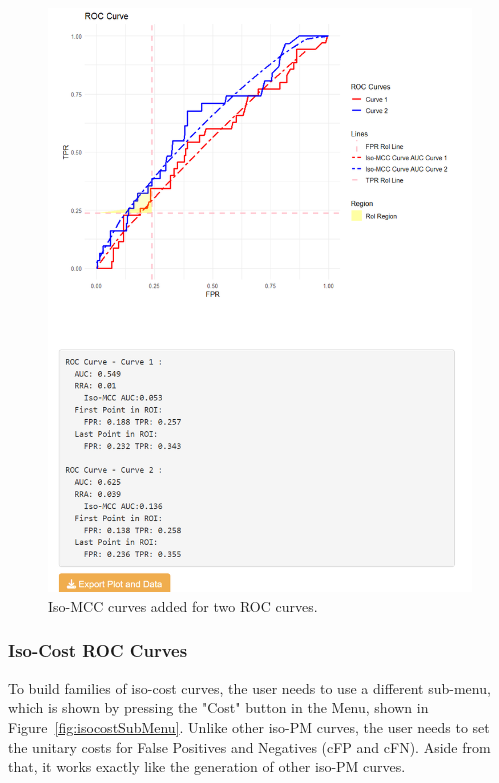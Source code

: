 \documentclass{article}
\begin{document}
	 \begin{figure}[h!]
	 	\centering
	 	\caption{Iso-MCC curves added for two ROC curves.}
	 	\label{fig:isocurveAUC}
	 	\includegraphics[width=1\linewidth]{Figures/iso_cost_result_plot_print.png}
	 \end{figure}
	  
	 \subsubsection{Iso-Cost ROC Curves}
	 To build families of iso-cost curves, the user needs to use a different sub-menu, which is shown by pressing the "Cost" button in the Menu, shown in Figure~\ref{fig:isocostSubMenu}. Unlike other iso-PM curves, the user needs to set the unitary costs for False Positives and Negatives (cFP and cFN). Aside from that, it works exactly like the generation of other iso-PM curves.
	 
\end{document}

